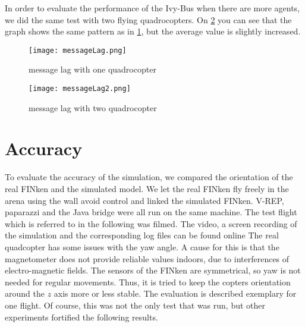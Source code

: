 In order to evaluate the performance of the Ivy-Bus when there are more agents, we did the same test with two flying quadrocopters. 
On \ref{fig:messageLag2} you can see that the graph shows the same pattern as in \ref{fig:messageLag}, but the average value is slightly increased.

\begin{figure}[h!]
 \begin{center}
  \texttt{[image: messageLag.png]}
 \end{center}
  \caption{message lag with one quadrocopter\label{fig:messageLag}}
\end{figure}

\begin{figure}[h!]
 \begin{center}
  \texttt{[image: messageLag2.png]}
 \end{center}
  \caption{message lag with two quadrocopter\label{fig:messageLag2}}
\end{figure}



\section{Accuracy}
\label{sec:accuracy}
To evaluate the accuracy of the simulation, we compared the orientation of the real FINken and the simulated model.  
We let the real FINken fly freely in the arena using the wall avoid control and linked the simulated FINken.
V-REP, paparazzi and the Java bridge were all run on the same machine.
The test flight which is referred to in the following was filmed.
The video, a screen recording of the simulation and the corresponding log files can be found online  
The real quadcopter has some issues with the yaw angle. 
A cause for this is that the magnetometer does not provide reliable values indoors, due to interferences of electro-magnetic fields.
The sensors of the FINken are symmetrical, so yaw is not needed for regular movements.
Thus, it is tried to keep the copters orientation around the $z$ axis more or less stable.
The evaluation is described exemplary for one flight. 
Of course, this was not the only test that was run, but other experiments fortified the following results.

